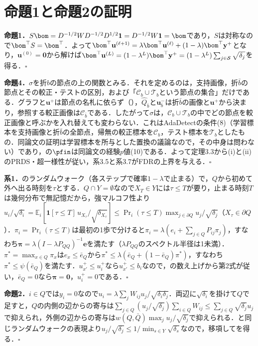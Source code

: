\section{命題1と命題2の証明}
\label{sec:app_proofs}
\textbf{命題1．}$S\bom=D^{-1/2}WD^{-1/2}D^{1/2}\mathbf{1}=D^{-1/2}W\mathbf{1}=\bom$であり，$S$は対称なので$\bom^{\top}S=\bom^{\top}$．よって$\bom^{\top}\mathbf{u}^{(\ell+1)}=\lambda\bom^{\top}\mathbf{u}^{(\ell)}+(1-\lambda)\bom^{\top}\mathbf{y}^{+}$となり，$\mathbf{u}^{(0)}=\mathbf{0}$から解けば$\bom^{\top}\mathbf{u}^{(L)}=(1-\lambda^{L})\bom^{\top}\mathbf{y}^{+}=(1-\lambda^{L})\sum_{j\in\mathcal{S}}\sqrt{\delta_j}$を得る．$\square$

\textbf{命題4．}$\sigma$を折$b$の節点の上の関数とみる．それを定めるのは，支持画像，折$\bar b$の節点とその較正・テストの区別，および「$\mathcal{C}_b\cup\mathcal{T}_b$という節点の集合」だけである．グラフと$\mathbf{u}^{+}$は節点の名札に依らず（），$\hat{Q}_{\bar b}$と$\mathbf{u}^{-}_{\bar b}$は折$\bar b$の画像と$\mathbf{u}^{+}$から決まり，参照する較正画像は$\mathcal{C}_{\bar b}$である．したがって$\sigma$は，$\mathcal{C}_b\cup\mathcal{T}_b$の中でどの節点を較正画像と呼ぶかを入れ替えても変わらない．これはAdaDetectの条件(8)（学習標本を支持画像と折$\bar b$の全節点，帰無の較正標本を$\mathcal{C}_b$，テスト標本を$\mathcal{T}_b$としたもの．同論文の証明は学習標本を所与とした置換の議論なので，その中身は問わない）であり，の$\pfin$は同論文の経験$p$値(10)である．よって定理3.3から(i)と(ii)のPRDS・超一様性が従い，系3.5と系3.7がFDRの上界を与える．$\square$

\textbf{系1．}のランダムウォーク（各ステップで確率$1-\lambda$で止まる）で，$Q$から初めて外へ出る時刻を$\tau$とする．$Q\cap Y=\emptyset$なので$X_T\in Y$には$\tau\le T$が要り，止まる時刻$T$は幾何分布で無記憶だから，強マルコフ性より$u_i/\sqrt{\delta_i}=\mathbb{E}_i[\mathbf{1}[\tau\le T]\,u_{X_\tau}/\sqrt{\delta_{X_\tau}}]\le\Pr_i(\tau\le T)\max_{j\in\partial Q}u_j/\sqrt{\delta_j}$（$X_\tau\in\partial Q$）．$\pi_i=\Pr_i(\tau\le T)$は最初の1歩で分けると$\pi_i=\lambda(e_i+\sum_{j\in Q}P_{ij}\pi_j)$，すなわち$\boldsymbol{\pi}=\lambda(I-\lambda P_{QQ})^{-1}\mathbf{e}$を満たす（$\lambda P_{QQ}$のスペクトル半径は1未満）．$\pi^{*}=\max_{x\in Q}\pi_x$は$e_x\le\bar e_Q$から$\pi^{*}\le\lambda(\bar e_Q+(1-\bar e_Q)\pi^{*})$，すなわち$\pi^{*}\le\psi(\bar e_Q)$を満たす．$u^{+}_{x'}\le u^{+}_i$なら$u^{+}_{x'}\le b_i$なので，の数え上げから第2式が従い，$\bar e_Q=0$なら$\boldsymbol{\pi}=\mathbf{0}$，$u^{+}_i=0$である．$\square$

\textbf{命題2．}$i\in Q$では$y_i=0$なので$u_i=\lambda\sum_jW_{ij}u_j/\sqrt{\delta_i\delta_j}$．両辺に$\sqrt{\delta_i}$を掛けて$Q$で足すと，$Q$の内側の辺からの寄与は$\sum_{j\in Q}(u_j/\sqrt{\delta_j})\sum_{i\in Q}W_{ij}\le\sum_{j\in Q}\sqrt{\delta_j}u_j$で抑えられ，外側の辺からの寄与は$w(Q,\bar{Q})\max_{j}u_j/\sqrt{\delta_j}$で抑えられる．と同じランダムウォークの表現より$u_j/\sqrt{\delta_j}\le1/\min_{s\in Y}\sqrt{\delta_s}$なので，移項してを得る．$\square$

